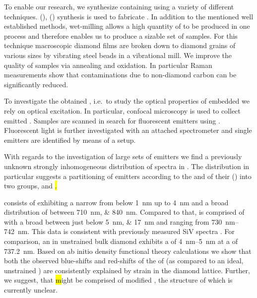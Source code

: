    To enable our research, we synthesize \nds containing \sivs using a variety of different techniques. \Cvd (\CVD), \hpht (\HPHT) synthesis is used to fabricate \nds. In addition to the mentioned well established methods, wet-milling allows a high quantity of \nds to be produced in one process and therefore enables us to produce a sizable set of \nd samples. For this technique macroscopic diamond films are broken down to diamond grains of various sizes by vibrating steel beads in a vibrational mill. We improve the quality of \nd samples via annealing and oxidation. In particular Raman measurements show that contaminations due to non-diamond carbon can be significantly reduced.

   To investigate the obtained \nds, i.e.\ to study the optical properties of embedded \sivs we rely on optical excitation. In particular, confocal microscopy is used to collect emitted \fl. Samples are scanned in search for fluorescent emitters using \apds. Fluorescent light is further investigated with an attached spectrometer and single emitters are identified by means of a \HBT setup.



   With regards to the investigation of large sets of emitters we find a previously unknown strongly inhomogeneous distribution of \siv spectra in \nds. The distribution in particular suggests a partitioning of emitters according to the \wl and \lw of their \zpls (\ZPL) into two groups, \vl and \hl.

   \Hl consists of \ZPLs exhibiting a narrow \lw from below \SI{1}{nm} up to \SI{4}{nm} and a broad distribution of \cwls between \SIlist{710;840}{nm}.
   Compared to that, \vl is comprised of \ZPLs with a broad \lw between just below \SIlist{5; 17}{nm} and \cwls ranging from \SIrange{730}{742}{nm}.
   This data is consistent with previously measured SiV spectra \cite{Benedikter2017a,Neu2012}.
   For comparison, an \siv in unstrained bulk diamond exhibits a \lw of \SIrange{4}{5}{nm} at a \cwl of \SI{737.2}{nm}\cite{Arend2016a,Dietrich2014}.
   Based on ab initio density functional theory calculations we show that both the observed blue-shifts and red-shifts of the \ZPLs of \vl (as compared to an ideal, unstrained \siv) are consistently explained by strain in the diamond lattice.
   Further, we suggest, that \hl might be comprised of modified \sivs, the structure of which is currently unclear.

